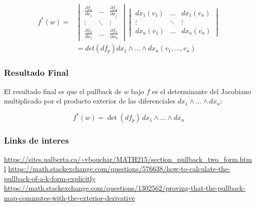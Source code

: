 \documentclass{beamer}
\begin{document}
\begin{frame}
\begin{align*}
f^{*}(w) =& \begin{vmatrix}
\frac{\partial f_{1}}{\partial x_{1}} & \dots & \frac{\partial f_{1}}{\partial x_{j}} \\
\vdots & \ddots & \vdots \\
\frac{\partial f_{n}}{\partial x_{1}} & \dots & \frac{\partial f_{n}}{\partial x_{n}}
\end{vmatrix} \begin{vmatrix}
dx_{1} (v_1) & \dots & dx_{1} (v_n) \\
\vdots & \ddots & \vdots \\
dx_{n} (v_1) & \dots & dx_{n} (v_n)
\end{vmatrix} \\
&=det(df_{p}) dx_{1} \wedge \dots \wedge dx_{n} (v_1,\dots,v_n)
\end{align*}
\end{frame}



\begin{frame}
\frametitle{Resultado Final}
   El resultado final es que el pullback de \( w \) bajo \( f \) es el determinante del Jacobiano multiplicado por el producto exterior de las diferenciales \( dx_{1} \wedge \dots \wedge dx_{n} \):

   \[ f^{*}(w) = \det(df_{p}) \, dx_{1} \wedge \dots \wedge dx_{n} \]
\end{frame}

\begin{frame}
\frametitle{Links de interes}
\url{https://sites.ualberta.ca/~vbouchar/MATH215/section_pullback_two_form.html}
\url{https://math.stackexchange.com/questions/576638/how-to-calculate-the-pullback-of-a-k-form-explicitly}
\url{https://math.stackexchange.com/questions/1302562/proving-that-the-pullback-map-commutes-with-the-exterior-derivative}
\end{frame}
\end{document}
